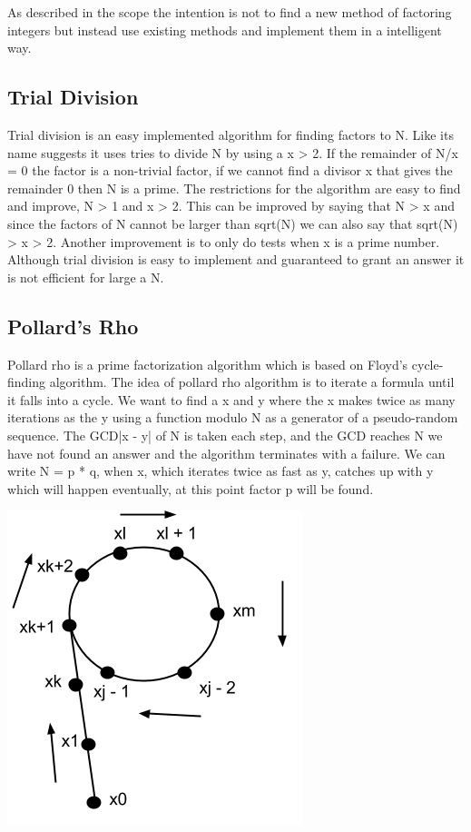As described in the scope the intention is not to find a new method of factoring integers but instead use existing methods and implement them in a intelligent way.

\subsection{Trial Division}
Trial division is an easy implemented algorithm for finding factors to N. Like its name suggests it uses tries to divide N by using a x > 2. If the remainder of N/x = 0 the factor is a non-trivial factor, if we cannot find a divisor x that gives the remainder 0 then N is a prime.
The restrictions for the algorithm are easy to find and improve, N > 1 and x > 2. This can be improved by saying that N > x and since the factors of N cannot be larger than sqrt(N) we can also say that sqrt(N) > x > 2. Another improvement is to only do tests when x is a prime number. Although trial division is easy to implement and guaranteed to grant an answer it is not efficient for large a N.

\subsection{Pollard's Rho}
Pollard rho is a prime factorization algorithm which is based on Floyd’s cycle-finding algorithm. The idea of pollard rho algorithm is to iterate a formula until it falls into a cycle. We want to find a x and y where the x makes twice as many iterations as the y using a function modulo N as a generator of a pseudo-random sequence. The GCD|x - y| of N is taken each step, and the GCD reaches N we have not found an answer and the algorithm terminates with a failure.
We can write N = p * q, when x, which iterates twice as fast as y, catches up with y which will happen eventually, at this point factor p will be found.

\includegraphics[scale = 0.5]{pollards.png}